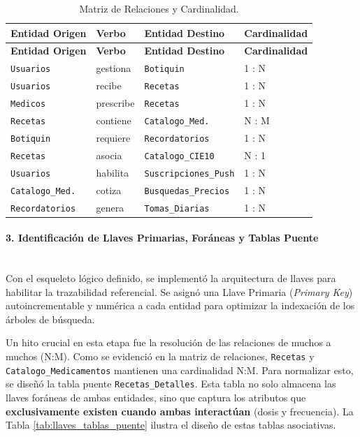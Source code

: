 \begin{longtable}{|p{}|p{}|p{}|p{}|}
\caption{Matriz de Relaciones y Cardinalidad.}
\label{tab:matriz_relaciones} \\
\hline
\textbf{Entidad Origen} & \textbf{Verbo} & \textbf{Entidad Destino} & \textbf{Cardinalidad} \\
\hline
\endfirsthead
\hline
\textbf{Entidad Origen} & \textbf{Verbo} & \textbf{Entidad Destino} & \textbf{Cardinalidad} \\
\hline
\endhead
\hline
\endfoot
\hline
\endlastfoot
\texttt{Usuarios} & gestiona & \texttt{Botiquin} & 1 : N \\
\hline
\texttt{Usuarios} & recibe & \texttt{Recetas} & 1 : N \\
\hline
\texttt{Medicos} & prescribe & \texttt{Recetas} & 1 : N \\
\hline
\texttt{Recetas} & contiene & \texttt{Catalogo\_Med.} & N : M \\
\hline
\texttt{Botiquin} & requiere & \texttt{Recordatorios} & 1 : N \\
\hline
\texttt{Recetas} & asocia & \texttt{Catalogo\_CIE10} & N : 1 \\
\hline
\texttt{Usuarios} & habilita & \texttt{Suscripciones\_Push} & 1 : N \\
\hline
\texttt{Catalogo\_Med.} & cotiza & \texttt{Busquedas\_Precios} & 1 : N \\
\hline
\texttt{Recordatorios} & genera & \texttt{Tomas\_Diarias} & 1 : N \\
\hline
\end{longtable}

\paragraph{3. Identificación de Llaves Primarias, Foráneas y Tablas Puente} \leavevmode \\

Con el esqueleto lógico definido, se implementó la arquitectura de llaves para habilitar la trazabilidad referencial. Se asignó una Llave Primaria (\textit{Primary Key}) autoincrementable y numérica a cada entidad para optimizar la indexación de los árboles de búsqueda.

Un hito crucial en esta etapa fue la resolución de las relaciones de muchos a muchos (N:M). Como se evidenció en la matriz de relaciones, \texttt{Recetas} y \texttt{Catalogo\_Medicamentos} mantienen una cardinalidad N:M. Para normalizar esto, se diseñó la tabla puente \texttt{Recetas\_Detalles}. Esta tabla no solo almacena las llaves foráneas de ambas entidades, sino que captura los atributos que \textbf{exclusivamente existen cuando ambas interactúan} (dosis y frecuencia). La Tabla \ref{tab:llaves_tablas_puente} ilustra el diseño de estas tablas asociativas.

